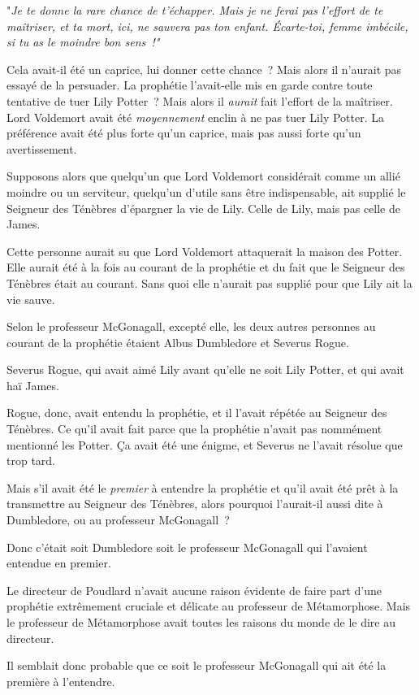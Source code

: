 "\emph{Je te donne la rare chance de t'échapper. Mais je ne ferai pas l'effort de te maîtriser, et ta mort, ici, ne sauvera pas ton enfant. Écarte-toi, femme imbécile, si tu as le moindre bon sens~!"}

Cela avait-il été un caprice, lui donner cette chance~? Mais alors il n'aurait pas essayé de la persuader. La prophétie l'avait-elle mis en garde contre toute tentative de tuer Lily Potter~? Mais alors il \emph{aurait} fait l'effort de la maîtriser. Lord Voldemort avait été \emph{moyennement} enclin à ne pas tuer Lily Potter. La préférence avait été plus forte qu'un caprice, mais pas aussi forte qu'un avertissement.

Supposons alors que quelqu'un que Lord Voldemort considérait comme un allié moindre ou un serviteur, quelqu'un d'utile sans être indispensable, ait supplié le Seigneur des Ténèbres d'épargner la vie de Lily. Celle de Lily, mais pas celle de James.

Cette personne aurait su que Lord Voldemort attaquerait la maison des Potter. Elle aurait été à la fois au courant de la prophétie et du fait que le Seigneur des Ténèbres était au courant. Sans quoi elle n'aurait pas supplié pour que Lily ait la vie sauve.

Selon le professeur McGonagall, excepté elle, les deux autres personnes au courant de la prophétie étaient Albus Dumbledore et Severus Rogue.

Severus Rogue, qui avait aimé Lily avant qu'elle ne soit Lily Potter, et qui avait haï James.

Rogue, donc, avait entendu la prophétie, et il l'avait répétée au Seigneur des Ténèbres. Ce qu'il avait fait parce que la prophétie n'avait pas nommément mentionné les Potter. Ça avait été une énigme, et Severus ne l'avait résolue que trop tard.

Mais s'il avait été le \emph{premier} à entendre la prophétie et qu'il avait été prêt à la transmettre au Seigneur des Ténèbres, alors pourquoi l'aurait-il aussi dite à Dumbledore, ou au professeur McGonagall~?

Donc c'était soit Dumbledore soit le professeur McGonagall qui l'avaient entendue en premier.

Le directeur de Poudlard n'avait aucune raison évidente de faire part d'une prophétie extrêmement cruciale et délicate au professeur de Métamorphose. Mais le professeur de Métamorphose avait toutes les raisons du monde de le dire au directeur.

Il semblait donc probable que ce soit le professeur McGonagall qui ait été la première à l'entendre.

